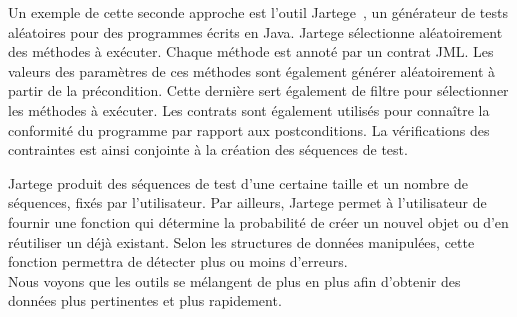 Un exemple de cette seconde approche est l'outil Jartege~, un
générateur de tests aléatoires pour des programmes écrits en Java. Jartege
sélectionne aléatoirement des méthodes à exécuter.  Chaque méthode est annoté
par un contrat JML. Les valeurs des paramètres de ces méthodes sont également
générer aléatoirement à partir de la précondition. Cette dernière sert également
de filtre pour sélectionner les méthodes à exécuter. Les contrats sont également
utilisés pour connaître la conformité du programme par rapport aux
postconditions. La vérifications des contraintes est ainsi conjointe à la
création des séquences de test.

Jartege produit des séquences de test d'une certaine taille et un nombre de
séquences, fixés par l'utilisateur. Par ailleurs, Jartege permet à l'utilisateur
de fournir une fonction qui détermine la probabilité de créer un nouvel objet ou
d'en réutiliser un déjà existant. Selon les structures de données manipulées,
cette fonction permettra de détecter plus ou moins d'erreurs. \\

Nous voyons que les outils se mélangent de plus en plus afin d'obtenir des
données plus pertinentes et plus rapidement.
